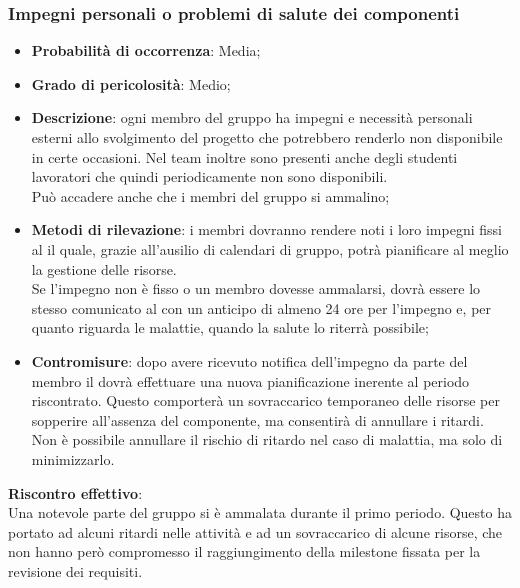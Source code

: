 		\subsubsection{Impegni personali o problemi di salute dei componenti} %
		\label{ssub:impegni_personali_dei_componenti}
			\begin{itemize}
				\item \textbf{Probabilità di occorrenza}: Media;
				\item \textbf{Grado di pericolosità}: Medio;
				\item \textbf{Descrizione}: ogni membro del gruppo ha impegni e necessità personali esterni allo svolgimento del progetto che potrebbero renderlo non disponibile in certe occasioni. Nel team inoltre sono presenti anche degli studenti lavoratori che quindi periodicamente non sono disponibili. \\
				Può accadere anche che i membri del gruppo si ammalino;
				\item \textbf{Metodi di rilevazione}: i membri dovranno rendere noti i loro impegni fissi al \roleProjectManager{} il quale, grazie all'ausilio di calendari di gruppo, potrà pianificare al meglio la gestione delle risorse. \\
				Se l'impegno non è fisso o un membro dovesse ammalarsi, dovrà essere lo stesso comunicato al \roleProjectManager{} con un anticipo di almeno 24 ore per l'impegno e, per quanto riguarda le malattie, quando la salute lo riterrà possibile;
				\item \textbf{Contromisure}: dopo avere ricevuto notifica dell'impegno da parte del membro il \roleProjectManager{} dovrà effettuare una nuova pianificazione inerente al periodo riscontrato. Questo comporterà un sovraccarico temporaneo delle risorse per sopperire all'assenza del componente, ma consentirà di annullare i ritardi. \\
				Non è possibile annullare il rischio di ritardo nel caso di malattia, ma solo di minimizzarlo.
			\end{itemize}
		\noindent
		\textbf{Riscontro effettivo}: \\
		Una notevole parte del gruppo si è ammalata durante il primo periodo. Questo ha portato ad alcuni ritardi nelle attività e ad un sovraccarico di alcune risorse, che non hanno però compromesso il raggiungimento della milestone fissata per la revisione dei requisiti.
		
